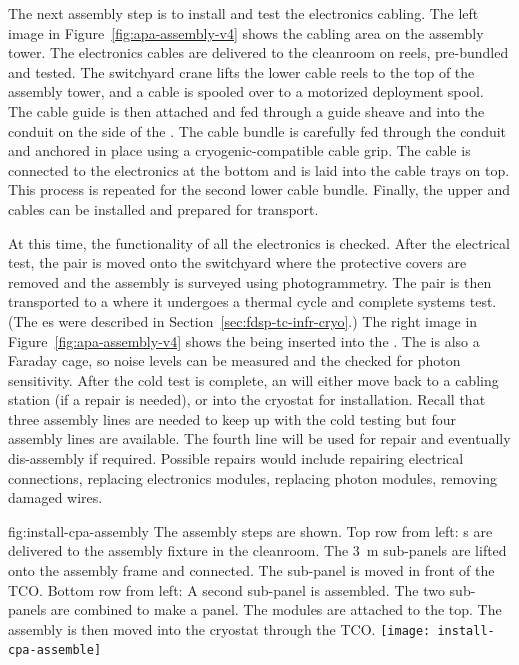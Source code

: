 The next assembly step is to install and test the electronics cabling.  The left image in Figure~\ref{fig:apa-assembly-v4} shows the  cabling area on the  assembly tower. 
The electronics cables are delivered to the cleanroom on reels,  pre-bundled and tested. 
The switchyard crane lifts the lower  cable reels to the top of the assembly tower, and a cable is spooled over to a motorized deployment spool. 
The cable guide is then attached and fed through a guide sheave and into the conduit on the side of the . 
The cable bundle is carefully fed through the conduit and anchored in place using a cryogenic-compatible cable grip. 
The cable is connected to the electronics at the bottom and is laid into the cable trays on top. This process is repeated for the second lower  cable bundle. 
Finally, the upper  and  cables can be installed and prepared for transport.

At this time, the functionality of all the electronics is checked. 
After the  electrical test, the  pair is moved onto the switchyard where the protective covers are removed and the assembly is surveyed using photogrammetry. 
The  pair is then transported to a \coldbox where it undergoes a thermal cycle and complete systems test. (The \coldbox{}es were described in Section~\ref{sec:fdsp-tc-infr-cryo}.)
The right image in Figure~\ref{fig:apa-assembly-v4} shows the  being inserted into the \coldbox. The \coldbox is also a Faraday cage, so noise levels can be measured and the  checked for photon sensitivity. 
After the cold test is complete, an  will either move back to a cabling station (if a repair is needed), or into the cryostat for installation. Recall that three assembly lines are needed to keep up with the cold testing but four assembly lines are available. The fourth line will be used for repair and eventually dis-assembly if required. Possible repairs would include repairing electrical connections, replacing electronics modules, replacing photon modules, removing damaged  wires. 


\begin{dunefigure}{fig:install-cpa-assembly}
  {The  assembly steps are shown. Top row from left:  s are delivered to the  assembly fixture in the cleanroom. The \SI{3}{m} sub-panels are lifted onto the assembly frame and connected. The  sub-panel is moved in front of the TCO. Bottom row from left: A second sub-panel is assembled. The two sub-panels are combined to make a  panel. The  modules are attached to the top. The assembly is then moved into the cryostat through the TCO.}
\texttt{[image: install-cpa-assemble]}
\end{dunefigure}

